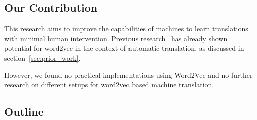 \subsection{Our Contribution}
This research aims to improve the capabilities of machines to learn translations with minimal human intervention. Previous research~\cite{mikolov2013exploiting, wolf2014joint} has already shown potential for word2vec in the context of automatic translation, as discussed in section~\ref{sec:prior_work}.

However, we found no practical implementations using Word2Vec and no further research on different setups for word2vec based machine translation.

\subsection{Outline}

